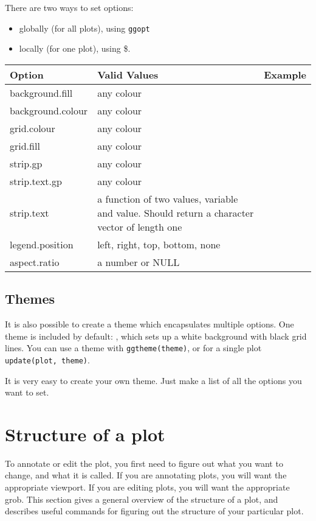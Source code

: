 There are two ways to set options:

\begin{itemize}
  \item globally (for all plots), using {\tt ggopt}
  \item locally (for one plot), using \$. 
\end{itemize}     
                 
\begin{tabular}{lp{1.5in}l}
Option & Valid Values & Example \\
\hline
background.fill    & any colour
& \\
background.colour  & any colour
& \\
grid.colour        & any colour
& \\
grid.fill          & any colour
& \\
strip.gp           & any colour
& \\
strip.text.gp      & any colour
& \\
strip.text         & a function of two values, variable and value.  Should return a character vector of length one
& \\
legend.position    & left, right, top, bottom, none
& \\
aspect.ratio       & a number or NULL
& \\
\hline
\end{tabular}

\subsection{Themes}\label{sub:themes}

It is also possible to create a theme which encapsulates multiple options.  One theme is included by default: {\tt }, which sets up a white background with black grid lines.  You can use a theme with {\tt ggtheme(theme)}, or for a single plot {\tt update(plot, theme)}.

It is very easy to create your own theme.  Just make a list of all the options you want to set.

\section{Structure of a plot}\label{sec:structure_of_a_plot}

To annotate or edit the plot, you first need to figure out what you want to change, and what it is called.  If you are annotating plots, you will want the appropriate viewport.  If you are editing plots, you will want the appropriate grob.  This section gives a general overview of the structure of a plot, and describes useful commands for figuring out the structure of your particular plot.

